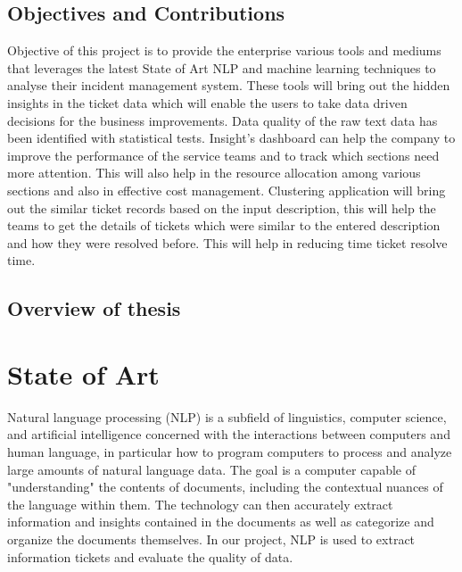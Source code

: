 \documentclass[a4paper,12pt]{report}
\begin{document}
    \section{Objectives and Contributions}
    Objective of this project is to provide the enterprise various tools and mediums that leverages the latest State of Art NLP and machine learning techniques to 
    analyse their incident management system. These tools will bring out the hidden insights in the ticket data which will enable the users to take data driven decisions for the business improvements.
    \newline\newline
    Data quality of the raw text data has been identified with statistical tests.
    Insight’s dashboard can help the company to improve the performance of the service teams and to track which sections need more attention. This will also help in the resource allocation among various sections and also in effective cost management. Clustering application will bring out the similar ticket records based on the input description, this will help the teams to get the details of tickets which were similar to the entered description and how they were resolved before. This will help in reducing time ticket resolve time.


    
    \section{Overview of thesis}

    \chapter{State of Art}
    Natural language processing (NLP) \cite{NLPWiki} is a subfield of linguistics, computer science, and artificial intelligence concerned with the interactions between computers and human language, in particular how to program computers to process and analyze large amounts of natural language data. The goal is a computer capable of "understanding" the contents of documents, including the contextual nuances of the language within them. The technology can then accurately extract information and insights contained in the documents as well as categorize and organize the documents themselves.
    In our project, NLP is used to extract information tickets and evaluate the quality of data.
\end{document}
